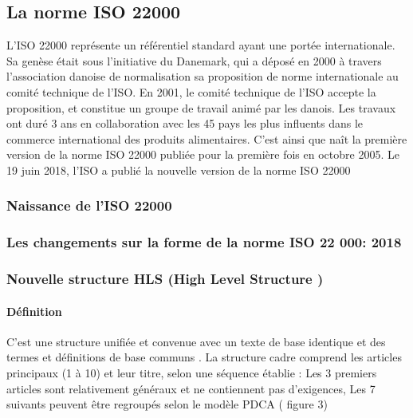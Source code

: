 \begin{spacing}{1.2}
\subsection{La norme ISO 22000}
L’ISO 22000  représente un référentiel standard ayant une portée internationale. Sa genèse était sous l’initiative du Danemark, qui a déposé en 2000 à travers  l’association danoise de normalisation sa proposition de norme internationale au comité technique de l’ISO. En 2001, le comité technique de l’ISO accepte la proposition, et constitue un groupe de travail animé par les danois. Les travaux ont duré 3 ans en collaboration avec les 45 pays les plus influents dans le commerce international des produits alimentaires. C’est ainsi que naît la première version de la norme ISO 22000 publiée pour la première fois en octobre 2005. Le 19 juin 2018, l’ISO a publié la nouvelle version de la norme ISO 22000
\subsubsection{Naissance de l’ISO 22000}

\subsubsection{Les changements sur la forme de la norme ISO 22 000: 2018}

\subsubsection{Nouvelle structure  HLS (High Level Structure )}
\paragraph{Définition}

C’est une structure unifiée et convenue avec un texte de base identique et des termes et définitions de base communs . La structure cadre comprend les articles principaux (1 à 10) et leur titre, selon une séquence établie : Les 3 premiers articles sont relativement généraux et ne contiennent pas d’exigences, Les 7 suivants peuvent être regroupés selon le modèle PDCA ( figure 3)


\end{spacing}
